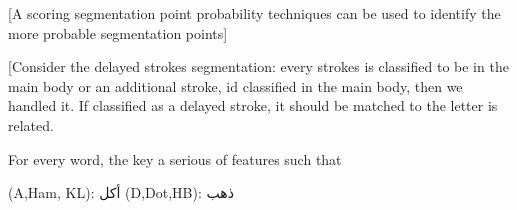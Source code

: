 \documentclass[journal,compsoc]{IEEEtran}
\begin{document}
[A scoring segmentation point probability techniques can be used to identify the more probable segmentation points]

[Consider the delayed strokes segmentation: every strokes is classified to be in the main body or an additional stroke, id classified in the main body, then we handled it. If classified as a delayed stroke, it should be matched to the letter is related.

For every word, the key a serious of features such that

(A,Ham, KL): أكل
(D,Dot,HB): ذهب




\end{document}
